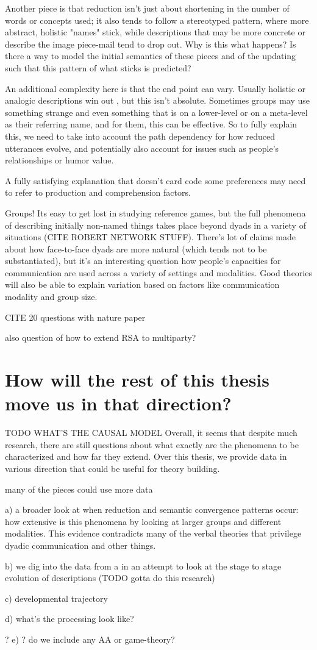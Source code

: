 \documentclass[]{article}
\begin{document}
	Another piece is that reduction isn't just about shortening in the number of words or concepts used; it also tends to follow a stereotyped pattern, where more abstract, holistic "names" stick, while descriptions that may be more concrete or describe the image piece-mail tend to drop out. Why is this what happens?  Is there a way to model the initial semantics of these pieces and of the updating such that this pattern of what sticks is predicted? 
	
	An additional complexity here is that the end point can vary. Usually holistic or analogic descriptions win out \cite{clark1986}, but this isn't absolute. Sometimes groups may use something strange and even something that is on a lower-level or on a meta-level as their referring name, and for them, this can be effective. So to fully explain this, we need to take into account the path dependency for how reduced utterances evolve, and potentially also account for issues such as people's relationships or humor value. 
	
	A fully satisfying explanation that doesn't card code some preferences may need to refer to production and comprehension factors. 
	
	Groups! Its easy to get lost in studying reference games, but the full phenomena of describing initially non-named things takes place beyond dyads in a variety of situations (CITE ROBERT NETWORK STUFF). There's lot of claims made about how face-to-face dyads are more natural (which tends not to be substantiated), but it's an interesting question how people's capacities for communication are used across a variety of settings and modalities. Good theories will also be able to explain variation based on factors like communication modality and group size. 
	
	CITE 20 questions with nature paper
	
	also question of how to extend RSA to multiparty? 
	
	\section{How will the rest of this thesis move us in that direction?}
	
	TODO WHAT'S THE CAUSAL MODEL
	Overall, it seems that despite much research, there are still questions about what exactly are the phenomena to be characterized and how far they extend. Over this thesis, we provide data in various direction that could be useful for theory building. 
	
	many of the pieces could use more data
	
	a) a broader look at when reduction and semantic convergence patterns occur: how extensive is this phenomena by looking at larger groups and different modalities. This evidence contradicts many of the verbal theories that privilege dyadic communication and other things. 
	
	b) we dig into the data from a in an attempt to look at the stage to stage evolution of descriptions (TODO gotta do this research)
	
	c) developmental trajectory
	
	d) what's the processing look like? 
	
	? e) ? do we include any AA or game-theory? 
\end{document}
